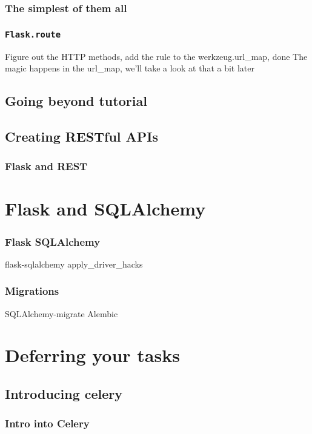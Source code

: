 \documentclass{beamer}
\begin{document}
\begin{frame}[fragile]
  \frametitle{The simplest of them all}
\end{frame}

\begin{frame}
  \frametitle{\texttt{Flask.route}}
  Figure out the HTTP methods, add the rule to the werkzeug.url\_map, done
  The magic happens in the url\_map, we'll take a look at that a bit later
\end{frame}


\subsection{Going beyond tutorial}

\subsection{Creating RESTful APIs}


\begin{frame}
  \frametitle{Flask and REST}
\end{frame}

\section{Flask and SQLAlchemy}


\begin{frame}
  \frametitle{Flask SQLAlchemy}
  flask-sqlalchemy
  apply\_driver\_hacks
\end{frame}

\begin{frame}
  \frametitle{Migrations}
  SQLAlchemy-migrate
  Alembic
\end{frame}


\section{Deferring your tasks}

\subsection{Introducing celery}


\begin{frame}
  \frametitle{Intro into Celery}
\end{frame}
\end{document}
